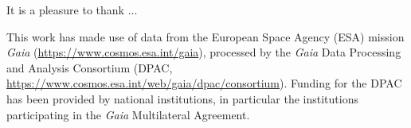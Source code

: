 \begin{acknowledgements}

It is a pleasure to thank ...



This work has made use of data from the European Space Agency (ESA) mission
{\it Gaia} (\url{https://www.cosmos.esa.int/gaia}), processed by the {\it Gaia}
Data Processing and Analysis Consortium (DPAC,
\url{https://www.cosmos.esa.int/web/gaia/dpac/consortium}). Funding for the DPAC
has been provided by national institutions, in particular the institutions
participating in the {\it Gaia} Multilateral Agreement.

\end{acknowledgements}


